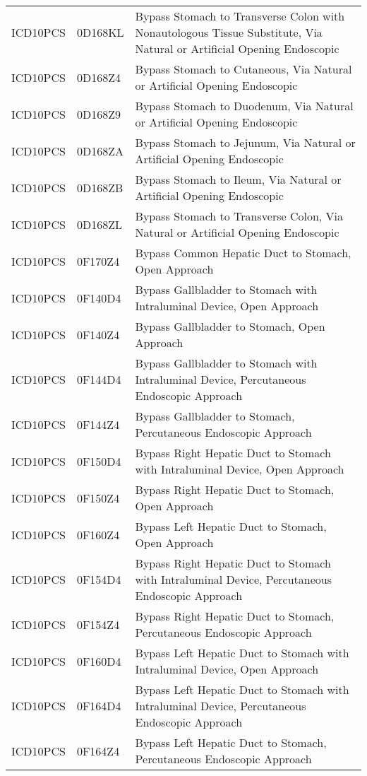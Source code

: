 \begin{longtable}{p{}p{}p{}}
  ICD10PCS & 0D168KL & Bypass Stomach to Transverse Colon with Nonautologous Tissue Substitute, Via Natural or Artificial Opening Endoscopic \\ 
  ICD10PCS & 0D168Z4 & Bypass Stomach to Cutaneous, Via Natural or Artificial Opening Endoscopic \\ 
  ICD10PCS & 0D168Z9 & Bypass Stomach to Duodenum, Via Natural or Artificial Opening Endoscopic \\ 
  ICD10PCS & 0D168ZA & Bypass Stomach to Jejunum, Via Natural or Artificial Opening Endoscopic \\ 
  ICD10PCS & 0D168ZB & Bypass Stomach to Ileum, Via Natural or Artificial Opening Endoscopic \\ 
  ICD10PCS & 0D168ZL & Bypass Stomach to Transverse Colon, Via Natural or Artificial Opening Endoscopic \\ 
  ICD10PCS & 0F170Z4 & Bypass Common Hepatic Duct to Stomach, Open Approach \\ 
  ICD10PCS & 0F140D4 & Bypass Gallbladder to Stomach with Intraluminal Device, Open Approach \\ 
  ICD10PCS & 0F140Z4 & Bypass Gallbladder to Stomach, Open Approach \\ 
  ICD10PCS & 0F144D4 & Bypass Gallbladder to Stomach with Intraluminal Device, Percutaneous Endoscopic Approach \\ 
  ICD10PCS & 0F144Z4 & Bypass Gallbladder to Stomach, Percutaneous Endoscopic Approach \\ 
  ICD10PCS & 0F150D4 & Bypass Right Hepatic Duct to Stomach with Intraluminal Device, Open Approach \\ 
  ICD10PCS & 0F150Z4 & Bypass Right Hepatic Duct to Stomach, Open Approach \\ 
  ICD10PCS & 0F160Z4 & Bypass Left Hepatic Duct to Stomach, Open Approach \\ 
  ICD10PCS & 0F154D4 & Bypass Right Hepatic Duct to Stomach with Intraluminal Device, Percutaneous Endoscopic Approach \\ 
  ICD10PCS & 0F154Z4 & Bypass Right Hepatic Duct to Stomach, Percutaneous Endoscopic Approach \\ 
  ICD10PCS & 0F160D4 & Bypass Left Hepatic Duct to Stomach with Intraluminal Device, Open Approach \\ 
  ICD10PCS & 0F164D4 & Bypass Left Hepatic Duct to Stomach with Intraluminal Device, Percutaneous Endoscopic Approach \\ 
  ICD10PCS & 0F164Z4 & Bypass Left Hepatic Duct to Stomach, Percutaneous Endoscopic Approach \\ 

\end{longtable}
